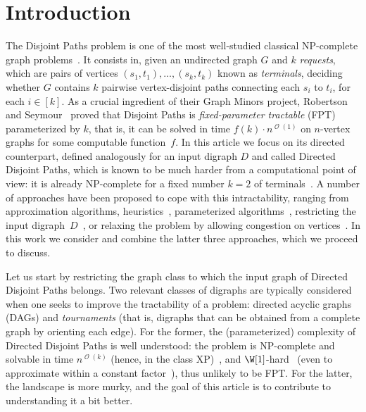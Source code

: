 \documentclass[a4paper,UKenglish,cleveref, autoref, thm-restate]{lipics-v2021}
\DeclareMathOperator{\Ocal}{\mathcal{O}\xspace}
\renewcommand{\NP}{{\sf NP}\xspace}
\renewcommand{\FPT}{{\sf FPT}\xspace}
\renewcommand{\XP}{{\sf XP}\xspace}
\begin{document}
\section{Introduction}\label{sec:intro}
The {\sc Disjoint Paths} problem is one of the most well-studied classical \NP-complete
graph problems~\cite{GJ79}. It consists in, given an undirected graph $G$ and $k$
\emph{requests}, which are pairs
of vertices $(s_1,t_1), \ldots, (s_k,t_k)$ known as \emph{terminals}, deciding whether $G$
contains $k$ pairwise vertex-disjoint paths connecting each $s_i$ to $t_i$, for each $i \in
[k]$. As a crucial ingredient of their Graph Minors project, Robertson and
Seymour~\cite{RobertsonS95b} proved that {\sc Disjoint Paths} is \emph{fixed-parameter
tractable} (\FPT) parameterized by $k$, that is, it can be solved in time $f(k) \cdot
n^{\Ocal(1)}$ on $n$-vertex graphs for some computable function~$f$. In this article we
focus on its directed counterpart, defined analogously for an input digraph $D$ and
called {\sc Directed Disjoint Paths}, which is known to be much harder from a
computational point of view: it is already \NP-complete for a fixed number $k=2$ of
terminals~\cite{FortuneHW80}.
A number of approaches have been proposed to cope with this
intractability, ranging from approximation algorithms\cite{ChekuriKS06,000124a},
heuristics~\cite{BrandesSNWW99,MartinsGT17}, parameterized
algorithms~\cite{FominP19,Slivkins2010}, restricting the input
digraph~$D$~\cite{FortuneHW80,thomassen_tournament_nph,Disjoint-paths-in-tournaments,FradkinS15,FradkinS13},
or relaxing the problem by allowing
congestion on
vertices~\cite{CamposC0S23,Edwards2017,GiannopoulouKKK22,KawarabayashiKK14,KawarabayashiK15,Amiri2019,Lopes2022}.
In this work we consider and combine the latter three approaches,
which we proceed to discuss.

Let us start by restricting the graph class to which the input graph of {\sc Directed
Disjoint Paths} belongs.
Two relevant classes of digraphs are typically considered when one seeks to improve the
tractability of a problem: directed acyclic graphs (DAGs) and \emph{tournaments} (that
is, digraphs that can be obtained from a complete graph by orienting each edge). For the
former, the (parameterized) complexity of {\sc Directed Disjoint Paths} is well
understood: the problem is \NP-complete and  solvable in time $n^{\Ocal(k)}$ (hence, in
the class \XP)~\cite{FortuneHW80}, and $\W[1]$-hard~\cite{Slivkins2010} (even to
approximate within a constant factor~\cite{000124a}), thus unlikely to
be \FPT. For the latter, the landscape is more murky, and the goal of this article is to
contribute to understanding it a bit better.
\end{document}
